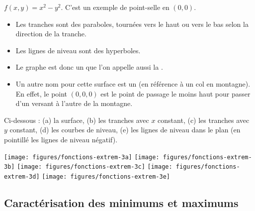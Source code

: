 \documentclass[11pt, class=report,crop=false]{standalone}
\begin{document}
\begin{exemple}
$f(x,y) = x^2 - y^2$. C'est un exemple de point-selle en $(0,0)$.

\begin{itemize}
  \item Les tranches sont des paraboles, tournées vers le haut ou vers le bas selon la direction de la tranche.
  \item Les lignes de niveau sont des hyperboles.
  \item Le graphe est donc un  que l'on appelle aussi la .
  \item Un autre nom pour cette surface est un  (en référence à un col en montagne). 
  En effet, le point $(0,0,0)$ est le point de passage le moins haut pour passer d'un versant à l'autre de la montagne. 
\end{itemize}

Ci-dessous : (a) la surface, (b) les tranches avec $x$ constant, (c) les tranches avec $y$ constant, (d) les courbes de niveau, (e) les lignes de niveau dans le plan (en pointillé les lignes de niveau négatif).
\begin{center}
\texttt{[image: figures/fonctions-extrem-3a]}
\texttt{[image: figures/fonctions-extrem-3b]}
\texttt{[image: figures/fonctions-extrem-3c]}
\texttt{[image: figures/fonctions-extrem-3d]}
\texttt{[image: figures/fonctions-extrem-3e]}
\end{center}

\end{exemple}





\subsection{Caractérisation des minimums et maximums}
\end{document}
